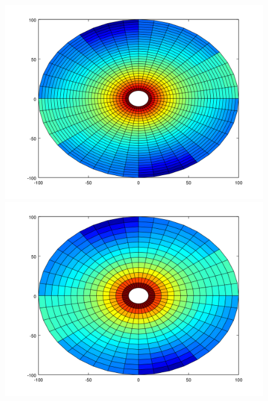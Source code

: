 \begin{figure}[H]
\centering
\begin{minipage}{0.30\textwidth}
  \centering
    \includegraphics[width=1\textwidth]{imgs/comp_rads_bueno/comp_radss_temp5.png}
  \caption{}
  \label{fig:Radios_1}
\end{minipage}%
\hspace{0.03\textwidth}
\begin{minipage}{0.30\textwidth}   
  \centering
    \includegraphics[width=1\textwidth]{imgs/comp_rads_bueno/comp_radss_temp2.png} 
    \caption{} 
  \label{fig:Radios_2}
\end{minipage}
\hspace{0.03\textwidth}
\begin{minipage}{0.30\textwidth}   

\end{minipage}
\end{figure}
